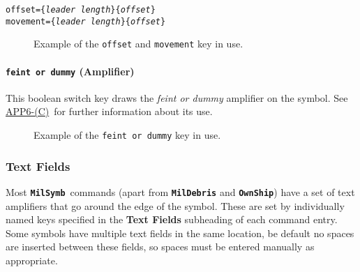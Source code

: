 \documentclass[a4paper, titlepage]{article}
\newcommand\MilSymb{\textbf{\texttt{MilSymb}}}
\newcommand\DocLink{\href{https://www.awl.edu.pl/images/en/APP_6_C.pdf}{APP6-(C)}}
\begin{document}
\texttt{offset=\{\textit{leader length}\}\{\textit{offset}\}}\\
\indent\texttt{movement=\{\textit{leader length}\}\{\textit{offset}\}}

\begin{figure}[H]
\centering
{}
\caption{Example of the \texttt{offset} and \texttt{movement}  key in use.}
\end{figure}

\paragraph{\texttt{feint or dummy} (Amplifier)}

This boolean switch key draws the \textit{feint or dummy} amplifier on the symbol. See \DocLink\ for further information about its use.

 \begin{figure}[H]
\centering
{}
\caption{Example of the \texttt{feint or dummy} key in use.}
\end{figure}

\subsubsection{Text Fields}

Most \MilSymb\ commands (apart from \textbf{\texttt{MilDebris}} and \textbf{\texttt{OwnShip}}) have a set of text amplifiers that go around the edge of the symbol. These are set by individually named keys specified in the \textbf{Text Fields} subheading of each command entry. Some symbols have multiple text fields in the same location, be default no spaces are inserted between these fields, so spaces must be entered manually as appropriate.
\end{document}
